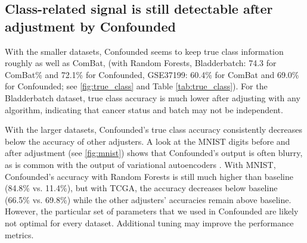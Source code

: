\documentclass[12pt]{article}
\begin{document}
\subsection{Class-related signal is still detectable after adjustment by Confounded}

With the smaller datasets, Confounded seems to keep true class information roughly as well as ComBat, (with Random Forests, Bladderbatch: 74.3 for ComBat\% and 72.1\% for Confounded, GSE37199: 60.4\% for ComBat and 69.0\% for Confounded; see \figurename{} \ref{fig:true_class} and Table \ref{tab:true_class}).
For the Bladderbatch dataset, true class accuracy is much lower after adjusting with any algorithm, indicating that cancer status and batch may not be independent.

With the larger datasets, Confounded's true class accuracy consistently decreases below the accuracy of other adjusters.
A look at the MNIST digits before and after adjustment (see \figurename{} \ref{fig:mnist}) shows that Confounded's output is often blurry, as is common with the output of variational autoencoders \cite{hou_deep_2016}.
With MNIST, Confounded's accuracy with Random Forests is still much higher than baseline (84.8\% vs. 11.4\%), but with TCGA, the accuracy decreases below baseline (66.5\% vs. 69.8\%) while the other adjusters' accuracies remain above baseline.
However, the particular set of parameters that we used in Confounded are likely not optimal for every dataset.
Additional tuning may improve the performance metrics.
\end{document}
